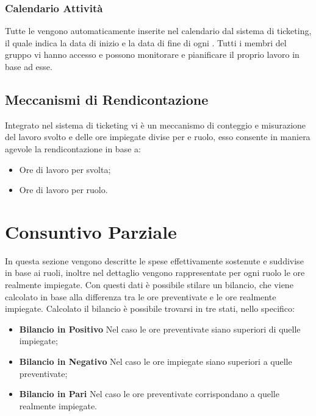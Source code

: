 \documentclass{scalatekids-article}
\begin{document}
\subsubsection{Calendario Attività}
Tutte le  vengono automaticamente inserite nel calendario dal sistema di ticketing, il quale
indica la data di inizio e la data di fine di ogni . Tutti i membri del gruppo vi hanno accesso
e possono monitorare e pianificare il proprio lavoro in base ad esse.
\subsection{Meccanismi di Rendicontazione}
Integrato nel sistema di ticketing vi è un meccanismo di conteggio e misurazione del lavoro svolto
e delle ore impiegate divise per  e ruolo, esso consente in maniera agevole la rendicontazione
in base a:
\begin{itemize}
\item{Ore di lavoro per  svolta;}
\item{Ore di lavoro per ruolo.}
\end{itemize}
\newpage
\section{Consuntivo Parziale}
In questa sezione vengono descritte le spese effettivamente sostenute e suddivise in base ai ruoli,
inoltre nel dettaglio vengono rappresentate per ogni ruolo le ore realmente impiegate. Con questi
dati è possibile stilare un bilancio, che viene calcolato in base alla differenza tra le ore preventivate
e le ore realmente impiegate.
Calcolato il bilancio è possibile trovarsi in tre stati, nello specifico:
\begin{itemize}
\item{\textbf{Bilancio in Positivo} Nel caso le ore preventivate siano superiori di quelle impiegate;}
\item{\textbf{Bilancio in Negativo} Nel caso le ore impiegate siano superiori a quelle preventivate;}
\item{\textbf{Bilancio in Pari} Nel caso le ore preventivate corrispondano a quelle realmente impiegate.}
\end{itemize}
\end{document}

